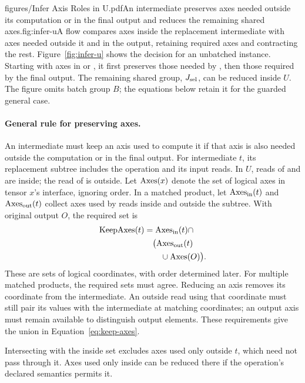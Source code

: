 \begin{figuretext}{figures/Infer Axis Roles in U.pdf}{An intermediate preserves axes needed outside its computation or in the final output and reduces the remaining shared axes.}{fig:infer-u}{A flow compares axes inside the replacement intermediate with axes needed
outside it and in the output, retaining required axes and contracting the rest.}
Figure~\ref{fig:infer-u} shows the decision for an unbatched instance.
Starting with axes in  or , it first preserves those needed
by , then those required by the final output. The remaining shared
group, $J_{\mathrm{sel}}$, can be reduced inside $U$. The figure omits batch group $B$;
the equations below retain it for the guarded general case.

\paragraph{General rule for preserving axes.}
An intermediate must keep an axis used to compute it if that axis is also
needed outside the computation or in the final output. For intermediate $t$,
its replacement subtree includes the operation and its input reads. In $U$,
reads of  and  are inside; the read of  is outside.
Let $\operatorname{Axes}(x)$ denote the set of logical axes in tensor $x$'s interface,
ignoring order. In a matched product, let $\operatorname{Axes}_{\mathrm{in}}(t)$ and
$\operatorname{Axes}_{\mathrm{out}}(t)$ collect axes used by reads inside and outside the
subtree. With original output $O$, the required set is
\begin{equation}
\begin{aligned}
 \operatorname{KeepAxes}(t)&=\operatorname{Axes}_{\mathrm{in}}(t)\cap\\
 &\quad\bigl(\operatorname{Axes}_{\mathrm{out}}(t)\\
 &\qquad{}\cup\operatorname{Axes}(O)\bigr).
\end{aligned}
 \label{eq:keep-axes}
\end{equation}
These are sets of logical coordinates, with order determined later. For
multiple matched products, the required sets must agree.
Reducing an axis removes its coordinate from the intermediate. An outside
read using that coordinate must still pair its values with the intermediate
at matching coordinates; an output axis must remain available to distinguish
output elements. These requirements give the union in
Equation~\eqref{eq:keep-axes}.
\end{figuretext}

Intersecting with the inside set excludes axes
used only outside $t$, which need not pass through it. Axes used only inside
can be reduced there if the operation's declared semantics permits it.

